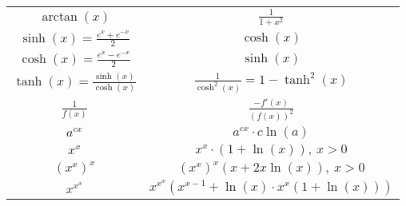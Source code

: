 \begin{center}
\begin{tabular}{c|c}
    $\arctan(x)$ & $\frac{1}{1 + x^2}$ \\
    $\sinh(x) = \frac{e^x + e^{-x}}{2}$ & $\cosh(x)$ \\
    $\cosh(x) = \frac{e^x - e^{-x}}{2}$ & $\sinh(x)$ \\
    $\tanh(x) = \frac{\sinh(x)}{\cosh(x)}$ & $\frac{1}{\cosh^2(x)} = 1 - \tanh^2(x)$ \\
    $\frac{1}{f(x)}$ & $\frac{-f'(x)}{(f(x))^2}$ \\
    $a^{cx}$ & $a^{cx} \cdot c \ln(a)$ \\
    $x^x$ & $x^x \cdot (1 + \ln(x)), \ x > 0$ \\
    $(x^x)^x$ & $(x^x)^x (x + 2x \ln(x)), \ x > 0$ \\
    $x^{x^x}$ & $x^{x^x} (x^{x - 1} + \ln(x) \cdot x^x (1 + \ln(x)))$ \\
\end{tabular}


\end{center}
